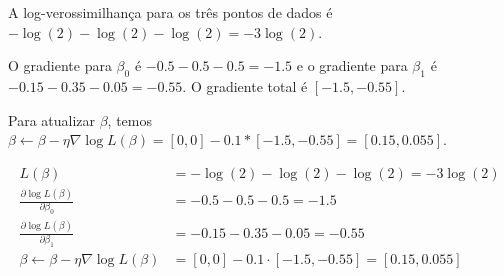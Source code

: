 \documentclass[12pt,a4paper, brazil]{article}
\begin{document}
\begin{enumerate}
A log-verossimilhança para os três pontos de dados é $-\log(2) - \log(2) - \log(2) = -3\log(2)$.

O gradiente para $\beta_0$ é $-0.5 - 0.5 - 0.5 = -1.5$ e o gradiente para $\beta_1$ é $-0.15 - 0.35 - 0.05 = -0.55$. O gradiente total é $[-1.5, -0.55]$.

Para atualizar $\beta$, temos $\beta \leftarrow \beta - \eta \nabla \log L(\beta) = [0, 0] - 0.1 * [-1.5, -0.55] = [0.15, 0.055]$.

\begin{equation*}
\begin{split}
L(\beta) &= -\log(2) - \log(2) - \log(2) = -3\log(2) \\
\frac{\partial \log L(\beta)}{\partial \beta_0} &= -0.5 - 0.5 - 0.5 = -1.5 \\
\frac{\partial \log L(\beta)}{\partial \beta_1} &= -0.15 - 0.35 - 0.05 = -0.55 \\
\beta \leftarrow \beta - \eta \nabla \log L(\beta) &= [0, 0] - 0.1 \cdot [-1.5, -0.55] = [0.15, 0.055]
\end{split}
\end{equation*}

\end{enumerate}

\printbibliography
\end{document}
